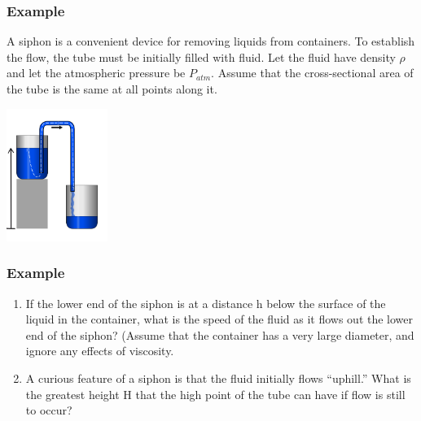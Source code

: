 \documentclass[]{beamer}
\begin{document}



      
  

  \begin{frame}
    \frametitle{Example \theexamplef }
  
 
    A siphon is a convenient
    device for removing liquids from containers. To establish the flow,
    the tube must be initially filled with fluid. Let the fluid have density $\rho$
    and let the atmospheric pressure be $P_{atm}$. Assume that the
    cross-sectional area of the tube is the same at all points along it. 


    \begin{center}
      \includegraphics[height=1.7in]{images2/Syphon.png}
    \end{center}


  
    \end{frame}





    \begin{frame}
  \frametitle{Example \theexamplef }



  \begin{enumerate}
    \item If the lower end of the siphon is at a distance h below the surface
    of the liquid in the container, what is the speed of the fluid as it
    flows out the lower end of the siphon? (Assume that the container
    has a very large diameter, and ignore any effects of viscosity.
    \item A curious feature of a siphon is that the fluid initially flows
    “uphill.” What is the greatest height H that the high point of the
    tube can have if flow is still to occur?
  \end{enumerate}
  

  \end{frame}
\end{document}
